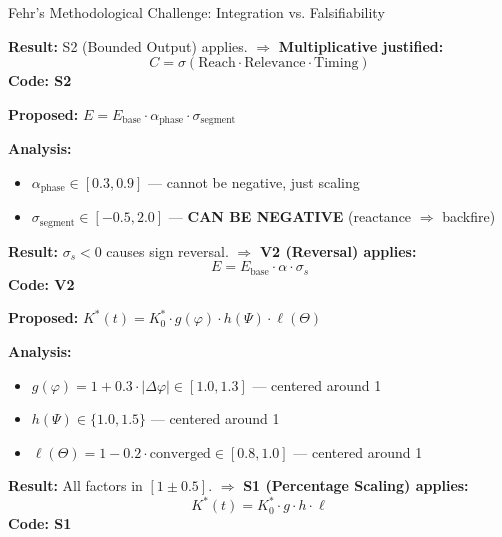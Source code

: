 \begin{chapter}{Fehr's Methodological Challenge: Integration vs. Falsifiability}
\begin{example}
\textbf{Result:} S2 (Bounded Output) applies. $\Rightarrow$ \textbf{Multiplicative justified:}
\begin{equation}
C = \sigma(\text{Reach} \cdot \text{Relevance} \cdot \text{Timing})
\end{equation}
\textbf{Code: S2}
\end{example}

\begin{example}
\label{ex:exc-backfire}
\textbf{Proposed:} $E = E_{\text{base}} \cdot \alpha_{\text{phase}} \cdot \sigma_{\text{segment}}$

\textbf{Analysis:}
\begin{itemize}[noitemsep]
    \item $\alpha_{\text{phase}} \in [0.3, 0.9]$ --- cannot be negative, just scaling
    \item $\sigma_{\text{segment}} \in [-0.5, 2.0]$ --- \textbf{CAN BE NEGATIVE} (reactance $\Rightarrow$ backfire)
\end{itemize}

\textbf{Result:} $\sigma_s < 0$ causes sign reversal. $\Rightarrow$ \textbf{V2 (Reversal) applies:}
\begin{equation}
E = E_{\text{base}} \cdot \alpha \cdot \sigma_s
\end{equation}
\textbf{Code: V2}
\end{example}

\begin{example}
\label{ex:exc-dynamic}
\textbf{Proposed:} $K^*(t) = K^*_0 \cdot g(\varphi) \cdot h(\Psi) \cdot \ell(\Theta)$

\textbf{Analysis:}
\begin{itemize}[noitemsep]
    \item $g(\varphi) = 1 + 0.3 \cdot |\Delta\varphi| \in [1.0, 1.3]$ --- centered around 1
    \item $h(\Psi) \in \{1.0, 1.5\}$ --- centered around 1
    \item $\ell(\Theta) = 1 - 0.2 \cdot \text{converged} \in [0.8, 1.0]$ --- centered around 1
\end{itemize}

\textbf{Result:} All factors in $[1 \pm 0.5]$. $\Rightarrow$ \textbf{S1 (Percentage Scaling) applies:}
\begin{equation}
K^*(t) = K^*_0 \cdot g \cdot h \cdot \ell
\end{equation}
\textbf{Code: S1}
\end{example}


\end{chapter}
